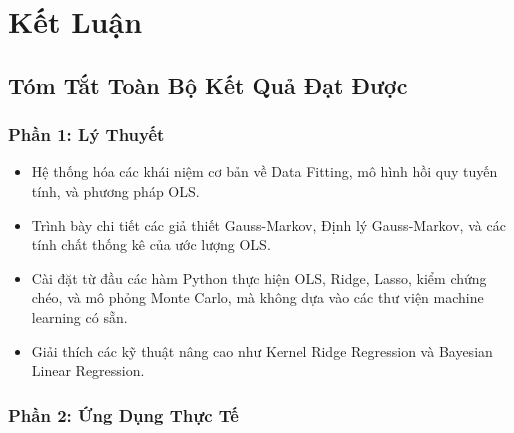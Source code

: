\documentclass[12pt,a4paper]{report}
\begin{document}
\clearpage
 
\chapter{Kết Luận}
 
\section{Tóm Tắt Toàn Bộ Kết Quả Đạt Được}
 
\subsection{Phần 1: Lý Thuyết}
 
\begin{itemize}
    \item Hệ thống hóa các khái niệm cơ bản về Data Fitting, mô hình hồi quy tuyến tính, và phương pháp OLS.
    \item Trình bày chi tiết các giả thiết Gauss-Markov, Định lý Gauss-Markov, và các tính chất thống kê của ước lượng OLS.
    \item Cài đặt từ đầu các hàm Python thực hiện OLS, Ridge, Lasso, kiểm chứng chéo, và mô phỏng Monte Carlo, mà không dựa vào các thư viện machine learning có sẵn.
    \item Giải thích các kỹ thuật nâng cao như Kernel Ridge Regression và Bayesian Linear Regression.
\end{itemize}
 
\subsection{Phần 2: Ứng Dụng Thực Tế}
 
\end{document}
